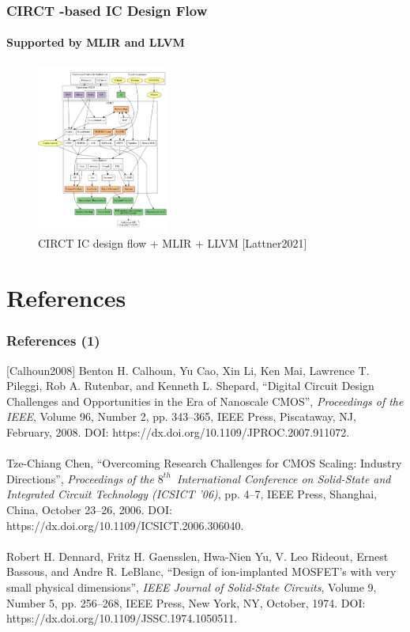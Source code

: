 \documentclass[xcolor={usenames,dvipsnames},hyperref={hyperindex,bookmarks}]{beamer}
\begin{document}
\begin{frame}
	\frametitle{CIRCT -based IC Design Flow}
	\framesubtitle{Supported by MLIR and LLVM}
	
	\begin{figure}
		\centering
		\includegraphics[height=2.2in]{./pics/CIRCTMLIR}
		\caption{CIRCT IC design flow + MLIR + LLVM [Lattner2021]}
	\end{figure}
\end{frame}





\section*{References}


\begin{frame}
	\frametitle{References (1)}
	
	[Calhoun2008] Benton H. Calhoun, Yu Cao, Xin Li, Ken Mai, Lawrence T. Pileggi, Rob A. Rutenbar, and Kenneth L. Shepard, ``Digital Circuit Design Challenges and Opportunities in the Era of Nanoscale {CMOS}'', {\it Proceedings of the {IEEE}}, Volume 96, Number 2, pp. 343--365, {IEEE} Press, Piscataway, {NJ}, February, 2008. DOI: https://dx.doi.org/10.1109/JPROC.2007.911072. \\
	\ \\
	[Chen2006] Tze-Chiang Chen, ``Overcoming Research Challenges for {CMOS} Scaling: Industry Directions'', {\it Proceedings of the $8^{th}$\ International Conference on Solid-State and Integrated Circuit Technology ({ICSICT '06})}, pp. 4--7, {IEEE} Press, Shanghai, China, October 23--26, 2006. DOI: https://dx.doi.org/10.1109/ICSICT.2006.306040. \\
	\ \\
	[Dennard1974] Robert H. Dennard, Fritz H. Gaensslen, Hwa-Nien Yu, V. Leo Rideout, Ernest Bassous, and Andre R. {LeBlanc}, ``Design of ion-implanted {MOSFET}'s with very small physical dimensions'', {\it {IEEE} Journal of Solid-State Circuits}, Volume 9, Number 5, pp. 256--268, {IEEE} Press, New York, {NY}, October, 1974. DOI: https://dx.doi.org/10.1109/JSSC.1974.1050511.

\end{frame}
\end{document}
